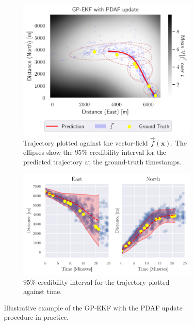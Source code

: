 \begin{figure}
    \centering
    \begin{subfigure}{\textwidth}
        \centering
        \includegraphics[width=\textwidth]{figures/dyngp/gp_ekf_with_pdaf.pdf}
        \caption{Trajectory plotted against the vector-field $\vec{f}(\boldsymbol{x})$. The ellipses show the $95\%$ credibility interval for the predicted trajectory at the ground-truth timestamps.}
    \end{subfigure}
    \begin{subfigure}{\textwidth}
        \centering
        \includegraphics[width=\textwidth]{figures/dyngp/gp_ekf_with_pdaf_state.pdf}
        \caption{$95\%$ credibility interval for the trajectory plotted against time.}
    \end{subfigure}
    \caption{Illustrative example of the GP-EKF with the PDAF update procedure in practice.}
    \label{fig:gp_ekf_with_pdaf}
\end{figure}

